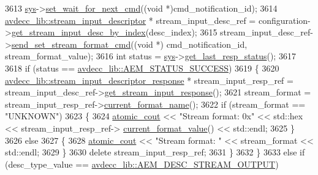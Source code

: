 \begin{DoxyCode}
3613         \hyperlink{classcmd__line_a485db4800e331cb4052c447fdf5d154e}{sys}->\hyperlink{classavdecc__lib_1_1system_a26b769584f10225077da47583edda33e}{set\_wait\_for\_next\_cmd}((\textcolor{keywordtype}{void} *)cmd\_notification\_id);
3614         \hyperlink{classavdecc__lib_1_1stream__input__descriptor}{avdecc\_lib::stream\_input\_descriptor} * stream\_input\_desc\_ref = 
      configuration->\hyperlink{classavdecc__lib_1_1configuration__descriptor_a69cfe9032cea21937b4153878f8a925c}{get\_stream\_input\_desc\_by\_index}(desc\_index);
3615         stream\_input\_desc\_ref->\hyperlink{classavdecc__lib_1_1stream__input__descriptor_a7407f2ca9a5a63a404e5f96ccdbf31f3}{send\_set\_stream\_format\_cmd}((\textcolor{keywordtype}{void} *)
      cmd\_notification\_id, stream\_format\_value);
3616         \textcolor{keywordtype}{int} status = \hyperlink{classcmd__line_a485db4800e331cb4052c447fdf5d154e}{sys}->\hyperlink{classavdecc__lib_1_1system_aa63e8d1a4e51f695cdcccc9340922407}{get\_last\_resp\_status}();
3617 
3618         \textcolor{keywordflow}{if} (status == \hyperlink{namespaceavdecc__lib_affd436edb2cecd20cfd784a84f852b2bac947077909cb590b84f4b5db413080e0}{avdecc\_lib::AEM\_STATUS\_SUCCESS})
3619         \{
3620             \hyperlink{classavdecc__lib_1_1stream__input__descriptor__response}{avdecc\_lib::stream\_input\_descriptor\_response} * 
      stream\_input\_resp\_ref = stream\_input\_desc\_ref->\hyperlink{classavdecc__lib_1_1stream__input__descriptor_a1be36084f46cee6b34b31b75e7667cc6}{get\_stream\_input\_response}();
3621             stream\_format = stream\_input\_resp\_ref->\hyperlink{classavdecc__lib_1_1stream__input__descriptor__response_a24176b56bc0f1873b27d00565bc397c5}{current\_format\_name}();
3622             \textcolor{keywordflow}{if} (stream\_format == \textcolor{stringliteral}{"UNKNOWN"})
3623             \{
3624                 \hyperlink{cmd__line_8h_a0bc38ccc65c79ba06c6fcd7b4bf554c3}{atomic\_cout} << \textcolor{stringliteral}{"Stream format: 0x"} << std::hex << stream\_input\_resp\_ref->
      \hyperlink{classavdecc__lib_1_1stream__input__descriptor__response_a6fded21e06a52c7031a0ce0b6f306ca0}{current\_format\_value}() << std::endl;
3625             \}
3626             \textcolor{keywordflow}{else}
3627             \{
3628                 \hyperlink{cmd__line_8h_a0bc38ccc65c79ba06c6fcd7b4bf554c3}{atomic\_cout} << \textcolor{stringliteral}{"Stream format: "} << stream\_format << std::endl;
3629             \}
3630             \textcolor{keyword}{delete} stream\_input\_resp\_ref;
3631         \}
3632     \}
3633     \textcolor{keywordflow}{else} \textcolor{keywordflow}{if} (desc\_type\_value == \hyperlink{namespaceavdecc__lib_ac7b7d227e46bc72b63ee9e9aae15902fa3e5e9421e49598854000feaa2fe71464}{avdecc\_lib::AEM\_DESC\_STREAM\_OUTPUT})

\end{DoxyCode}
